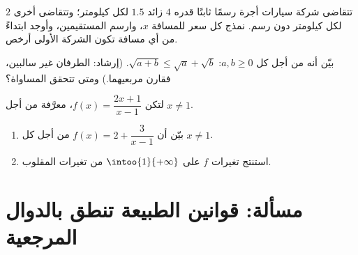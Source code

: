 \begin{exercise}[$\star\star$]\label{exo:g10:reffunc:8}
تتقاضى شركة سيارات أجرة رسمًا ثابتًا قدره $4$ زائد $1.5$ لكل كيلومتر؛
وتتقاضى أخرى $2$ لكل كيلومتر دون رسم. نمذج كل سعر  للمسافة $x$، وارسم المستقيمين، وأوجد ابتداءً من أي
مسافة تكون الشركة الأولى أرخص.
\end{exercise}

\begin{exercise}[$\star\star$]\label{exo:g10:reffunc:9}
بيّن أنه من أجل كل $a, b \geq 0$: $\sqrt{a + b} \leq \sqrt a + \sqrt b$.
(إرشاد: الطرفان غير سالبين، فقارن مربعيهما.) ومتى تتحقق
المساواة؟
\end{exercise}

\begin{exercise}[$\star\star\star$]\label{exo:g10:reffunc:10}
لتكن $f(x) = \dfrac{2x + 1}{x - 1}$، معرَّفة من أجل $x \neq 1$.
\begin{enumerate}
  \item بيّن أن $f(x) = 2 + \dfrac{3}{x - 1}$ من أجل كل $x \neq 1$.
  \item استنتج تغيرات $f$ على $\intoo{1}{+\infty}$ من تغيرات
         المقلوب.
\end{enumerate}
\end{exercise}

\section{مسألة: قوانين الطبيعة تنطق بالدوال المرجعية}

